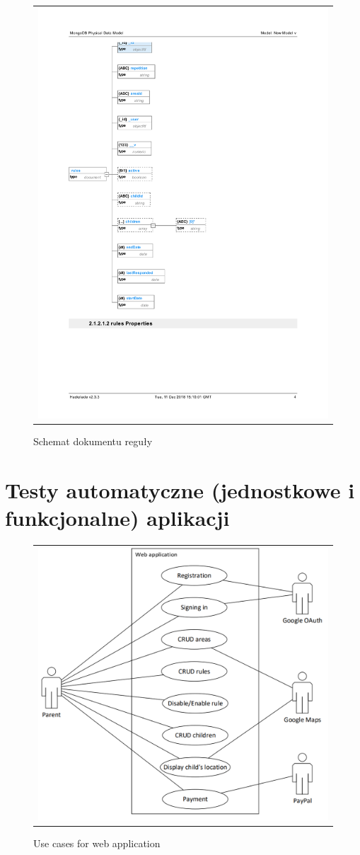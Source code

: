 \documentclass{sprawozdanie-agh}
\begin{document}
			\begin{figure}[H] 
				\centering 
				\begin{tabular}{c}
					\includegraphics[width=.70\textwidth]{rulesDatabase} 
				\end{tabular} 
				\caption{Schemat dokumentu reguły}
			\end{figure}


	\section{Testy automatyczne (jednostkowe i funkcjonalne) aplikacji}

	\begin{figure}[H]
    		\centering
    		\begin{tabular}{c}
    			\includegraphics[width=.80\textwidth]{webUseCase}
    		\end{tabular}
    		\caption{Use cases for web application}
    	\end{figure}
\end{document}
